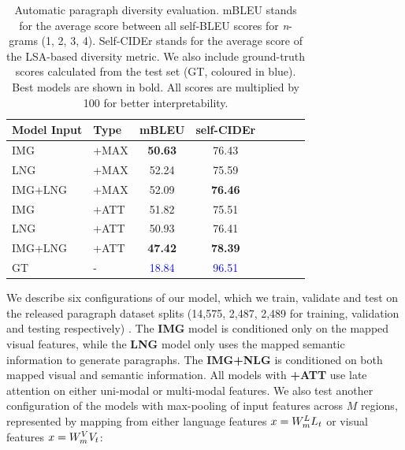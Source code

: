 \documentclass[11pt,a4paper]{article}
\begin{document}
\begin{table}[h]
   \footnotesize
  \centering
  \begin{tabular}{|l|l|c|c|c|c|c|c|}
  \hline
    \textbf{Model Input} & \textbf{Type} & \textbf{mBLEU} & \textbf{self-CIDEr}  \\
  \hline
   IMG & +MAX &  \cellcolor{red!30}\textbf{50.63} & \cellcolor{red!18}76.43 \\
  \hline
   LNG & +MAX & \cellcolor{red!10}52.24 & \cellcolor{red!10}75.59 \\
  \hline
   IMG+LNG & +MAX & \cellcolor{red!18}52.09 & \cellcolor{red!30}\textbf{76.46}  \\
  \hline
  \hline
   IMG & +ATT & \cellcolor{red!10}51.82 & \cellcolor{red!10}75.51  \\
  \hline
   LNG & +ATT & \cellcolor{red!18}50.93 & \cellcolor{red!18}76.41  \\
  \hline
   IMG+LNG & +ATT & \cellcolor{red!30}\textbf{47.42} & \cellcolor{red!30}\textbf{78.39} \\
  \hline
  \hline
   GT & - & \textcolor{blue}{18.84} & \textcolor{blue}{96.51} \\
  \hline
  \end{tabular}
  \caption{Automatic paragraph diversity evaluation. mBLEU stands for the average score between all self-BLEU scores for \textit{n}-grams (1, 2, 3, 4). Self-CIDEr stands for the average score of the LSA-based diversity metric. We also include ground-truth scores calculated from the test set (GT, coloured in blue). Best models are shown in bold. All scores are multiplied by 100 for better interpretability.}
  \label{tab:divstats}
\end{table}

We describe six configurations of our model, which we train, validate and test on the released paragraph dataset splits (14,575, 2,487, 2,489 for training, validation and testing respectively) \cite{krause2016hierarchical}. %
The \textbf{IMG} model is conditioned only on the mapped visual features, while the \textbf{LNG} model only uses the mapped semantic information to generate paragraphs.
The \textbf{IMG+NLG} is conditioned on both mapped visual and semantic information.
All models with \textbf{+ATT} use late attention on either uni-modal or multi-modal features. %
We also test another configuration of the models with max-pooling of input features across $M$ regions, represented by mapping from either language features $x=W_{m}\sp{L} L_t$ or visual features $x=W_{m}\sp{V} V_t$:
\end{document}
